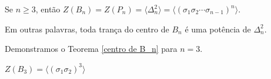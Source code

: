 	
	\begin{theorem}
		\label{centro de B_n}
		Se $n\geq 3$, então $Z(B_n) = Z(P_n) = \langle \Delta_n^2 \rangle = \langle (\sigma_1\sigma_2\cdots\sigma_{n-1})^n \rangle$.
	\end{theorem}
	
	\par\vspace{0.3cm} Em outras palavras, toda trança do centro de $B_n$ é uma potência de $\Delta_n^2$.%
	
	\par\vspace{0.3cm} Demonstramos o Teorema \eqref{centro de B_n} para $n=3$.
	
	\begin{prop}
		$Z(B_3) = \langle (\sigma_1\sigma_2)^3 \rangle$
	\end{prop}
	
